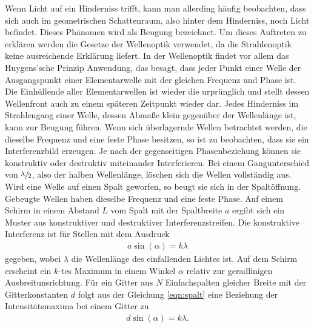 \noindent
Wenn Licht auf ein Hinderniss trifft, kann man allerding häufig beobachten, dass sich auch im geometrischen Schattenraum, also hinter dem Hinderniss, noch Licht befindet.
Dieses Phänomen wird als Beugung bezeichnet. Um dieses Auftreten zu erklären werden die Gesetze der Wellenoptik verwendet, da die Strahlenoptik keine ausreichende Erklärung liefert.  \newline
In der Wellenoptik findet vor allem das Huygens'sche Prinzip Anwendung, das besagt, dass jeder Punkt einer Welle der Ausgangspunkt einer Elementarwelle mit der gleichen Frequenz und Phase ist.
Die Einhüllende aller Elementarwellen ist wieder die urprünglich und stellt dessen Wellenfront auch zu einem späteren Zeitpunkt wieder dar.
Jedes Hinderniss im Strahlengang einer Welle, dessen Abmaße klein gegenüber der Wellenlänge ist, kann zur Beugung führen. \newline
Wenn sich überlagernde Wellen betrachtet werden, die dieselbe Frequenz und eine feste Phase besitzen, so ist zu beobachten, dass sie ein Interferenzbild erzeugen. Je nach
der gegenseitigen Phasenbeziehung können sie konstruktiv oder destruktiv miteinander Interferieren. Bei einem Gangunterschied von $\sfrac{\lambda}{2}$, also der halben Wellenlänge,
löschen sich die Wellen vollständig aus.
Wird eine Welle auf einen Spalt geworfen, so beugt sie sich in der Spaltöffnung. Gebeugte Wellen haben dieselbe Frequenz und eine feste Phase. Auf einem Schirm in einem Abstand $L$ vom Spalt mit der Spaltbreite $a$
ergibt sich ein Muster aus konstruktiver und destruktiver Interferenzstreifen. Die konstruktive Interferenz ist für Stellen mit dem Ausdruck
\begin{align}
    a\sin(\alpha)=k\lambda
    \label{eqn:spalt}
\end{align}
gegeben, wobei $\lambda$ die Wellenlänge des einfallenden Lichtes ist. Auf dem Schirm erscheint ein $k$-tes Maximum in einem Winkel $\alpha$ relativ zur geradlinigen Ausbreitunsrichtung.
Für ein Gitter aus $N$ Einfachspalten gleicher Breite mit der Gitterkonstanten $d$ folgt aus der Gleichung \eqref{eqn:spalt} eine Beziehung der Intensitätsmaxima bei einem Gitter zu
\begin{align}
    d\sin(\alpha)=k\lambda.
\end{align}